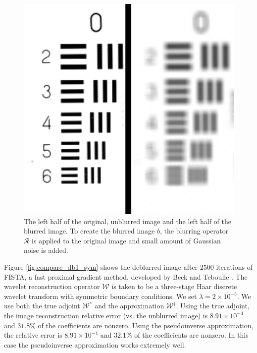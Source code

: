 \documentclass[journal]{IEEEtran}
\begin{document}
\begin{figure}
   \centering
   \includegraphics[width=0.8\columnwidth]{fig1.pdf}
   \caption{The left half of the original, unblurred image and the left half of the blurred image.  To create the blurred image $b$, the blurring operator $\mathcal{R}$ is applied to the original image and small amount of Gaussian noise is added.}
   \label{fig:original}
\end{figure}

Figure \ref{fig:compare_db1_sym} shows the deblurred image after 2500 iterations of FISTA, a fast proximal gradient method, developed by Beck and Teboulle \cite{beck_2009}.  The wavelet reconstruction operator $\mathcal{W}$ is taken to be a three-stage Haar discrete wavelet transform with symmetric boundary conditions.  We set $\lambda=2\times 10^{-5}$.  We use both the true adjoint $\mathcal{W}^\ast$ and the approximation $\mathcal{W}^\dagger$.  Using the true adjoint, the image reconstruction relative error (vs. the unblurred image) is $8.91\times10^{-4}$ and $31.8\%$ of the coefficients are nonzero.  Using the pseudoinverse approximation, the relative error is $8.91\times 10^{-4}$ and $32.1\%$ of the coefficients are nonzero.  In this case the pseudoinverse approximation works extremely well.
\end{document}

